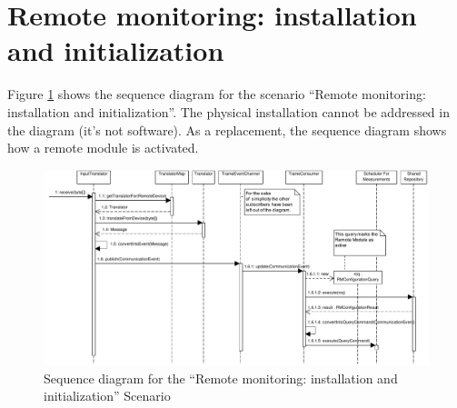\section{Remote monitoring: installation and initialization}
\label{scenario:rm-installation}

\npar Figure \ref{fig:scenario-5-3-1} shows the sequence diagram for the
scenario ``Remote monitoring: installation and initialization''. The physical
installation cannot be addressed in the diagram (it's not software). As a
replacement, the sequence diagram shows how a remote module is activated.

\begin{figure}[H]
	\begin{centering}
		\includegraphics[width=1.4\textwidth,angle=90]{figs/scenario-5-3-1.pdf}
		\caption{Sequence diagram for the ``Remote monitoring: installation and
		initialization'' Scenario}
		\label{fig:scenario-5-3-1}
	\end{centering}
\end{figure}